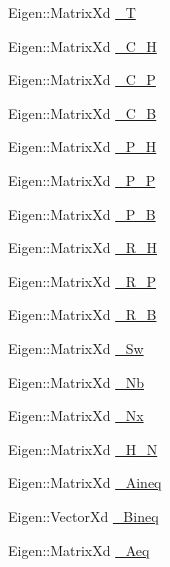 \begin{DoxyCompactItemize}
\item 
\-Eigen\-::\-Matrix\-Xd \hyperlink{classMIQPController_a1143455ae85d0e221578dbe5d659af1d}{\-\_\-\-T}
\item 
\-Eigen\-::\-Matrix\-Xd \hyperlink{classMIQPController_a323718c0eaf8c8a7e159ea7f1ef5b72c}{\-\_\-\-C\-\_\-\-H}
\item 
\-Eigen\-::\-Matrix\-Xd \hyperlink{classMIQPController_a17cf6f8279cf6b2ce333feb9c8fc5a5d}{\-\_\-\-C\-\_\-\-P}
\item 
\-Eigen\-::\-Matrix\-Xd \hyperlink{classMIQPController_a5c6882cb248e9d16513868fea7835d6e}{\-\_\-\-C\-\_\-\-B}
\item 
\-Eigen\-::\-Matrix\-Xd \hyperlink{classMIQPController_afb83c4fddc4adba989506ccc9b62ff1e}{\-\_\-\-P\-\_\-\-H}
\item 
\-Eigen\-::\-Matrix\-Xd \hyperlink{classMIQPController_a8243f4111abb4ad6c331ac147a844118}{\-\_\-\-P\-\_\-\-P}
\item 
\-Eigen\-::\-Matrix\-Xd \hyperlink{classMIQPController_a848852d659dff4a566a8dca57819587d}{\-\_\-\-P\-\_\-\-B}
\item 
\-Eigen\-::\-Matrix\-Xd \hyperlink{classMIQPController_a2207c17eb221166b1bc12fbca976035d}{\-\_\-\-R\-\_\-\-H}
\item 
\-Eigen\-::\-Matrix\-Xd \hyperlink{classMIQPController_a7cede44e7827c9b4b12f2549714f3adf}{\-\_\-\-R\-\_\-\-P}
\item 
\-Eigen\-::\-Matrix\-Xd \hyperlink{classMIQPController_a69fbc25a2e2f2392fe0f92c5811c12dd}{\-\_\-\-R\-\_\-\-B}
\item 
\-Eigen\-::\-Matrix\-Xd \hyperlink{classMIQPController_ada92fc35065a11b889019f2948c1888d}{\-\_\-\-Sw}
\item 
\-Eigen\-::\-Matrix\-Xd \hyperlink{classMIQPController_aaed002a2578a0f83c4ee59516a793f98}{\-\_\-\-Nb}
\item 
\-Eigen\-::\-Matrix\-Xd \hyperlink{classMIQPController_aefaa7a13d0c690dafca85792bdbed4fd}{\-\_\-\-Nx}
\item 
\-Eigen\-::\-Matrix\-Xd \hyperlink{classMIQPController_ab4b99d844add54fa7ad6ca6b80cab089}{\-\_\-\-H\-\_\-\-N}
\item 
\-Eigen\-::\-Matrix\-Xd \hyperlink{classMIQPController_a7678fd8e1c08986d7ae0dc1a884040e1}{\-\_\-\-Aineq}
\item 
\-Eigen\-::\-Vector\-Xd \hyperlink{classMIQPController_a02d441467a51e81e969163f096d3798a}{\-\_\-\-Bineq}
\item 
\-Eigen\-::\-Matrix\-Xd \hyperlink{classMIQPController_abc22f1db5a2dbcab4006c1b903a19c4e}{\-\_\-\-Aeq}

\end{DoxyCompactItemize}
